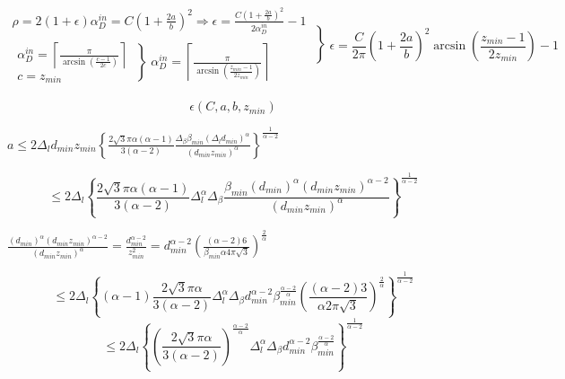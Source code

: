 \documentclass[conference]{IEEEtran}
\begin{document}
{  \begin{equation}
    \begin{array}{rl}
      \rho = 2(1+\epsilon)\alpha^{in}_{D}= C\left(1+\frac{2a}{b}\right)^{2} 
      \Longrightarrow 
      \epsilon = \frac{C\left(1+\frac{2a}{b}\right)^{2}}{2\alpha^{in}_{D}} - 1 \\
      \begin{array}{rl}
        \alpha^{in}_{D}= \left\lceil \frac{\pi}{\arcsin \left( \frac{c-1}{2c} \right)} \right\rceil\\
        c = z_{min}
      \end{array}     
      \left\}
        \alpha^{in}_{D}= \left\lceil \frac{\pi}{\arcsin \left( \frac{z_{min}-1}{2z_{min}} \right)} \right\rceil 
      \right.
    \end{array}
    \left\}
      \epsilon = \frac{C}{2\pi}\left(1+\frac{2a}{b}\right)^{2} \arcsin \left( \frac{z_{min}-1}{2z_{min}} \right)  - 1
    \right.  
  \end{equation}  

  \begin{equation}
    \epsilon(C,a,b,z_{min})
  \end{equation}        


$
      a \leq 2 \Delta_{l} d_{min} z_{min} 
      \left \{  
        \frac{2 \sqrt{3}\pi \alpha(\alpha-1)}{3(\alpha-2)}
        \frac{\Delta_{\beta}\beta_{min}(\Delta_{l}d_{min})^{\alpha}}{(d_{min} z_{min})^\alpha}
      \right\}^{\frac{1}{\alpha-2}}
$

$$
      \leq 2 \Delta_{l} 
      \left \{  
        \frac{2 \sqrt{3}\pi \alpha(\alpha-1)}{3(\alpha-2)}
        \Delta_{l}^{\alpha}\Delta_{\beta}
        \frac{\beta_{min}(d_{min})^{\alpha}(d_{min} z_{min})^{\alpha-2}}{(d_{min} z_{min})^\alpha}
      \right\}^{\frac{1}{\alpha-2}}
$$


$
\frac{(d_{min})^{\alpha}(d_{min} z_{min})^{\alpha-2}}{(d_{min} z_{min})^\alpha}
=\frac{d_{min}^{\alpha-2}}{z_{min}^2}
=d_{min}^{\alpha-2}\left(\frac{(\alpha-2)6}{\beta_{min}\alpha 4\pi\sqrt{3}}\right)^\frac{2}{\alpha}
$

  $$
      \leq 2 \Delta_{l} 
      \left \{  
        (\alpha-1)\frac{2 \sqrt{3}\pi \alpha}{3(\alpha-2)}
        \Delta_{l}^{\alpha}\Delta_{\beta}d_{min}^{\alpha-2}\beta_{min}^\frac{\alpha-2}{\alpha}
        \left(\frac{(\alpha-2)3}{\alpha 2\pi\sqrt{3}}\right)^\frac{2}{\alpha}
      \right\}^{\frac{1}{\alpha-2}}
  $$
  $$
      \leq 2 \Delta_{l} 
      \left \{  
        \left( \frac{2 \sqrt{3}\pi \alpha}{3(\alpha-2)} \right)^\frac{\alpha-2}{\alpha}
        \Delta_{l}^{\alpha}\Delta_{\beta}d_{min}^{\alpha-2}\beta_{min}^\frac{\alpha-2}{\alpha}        
      \right\}^{\frac{1}{\alpha-2}}
  $$

}
\end{document}
